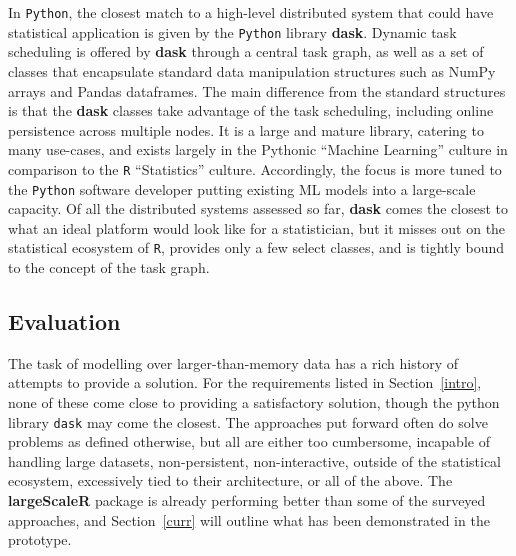 In \texttt{Python}, the closest match to a high-level distributed system that could have statistical application is given by the \texttt{Python} library \textbf{dask}\cite{rocklin2015dask}.
Dynamic task scheduling is offered by \textbf{dask} through a central task graph, as well as a set of classes that encapsulate standard data manipulation structures such as NumPy arrays and Pandas dataframes.
The main difference from the standard structures is that the \textbf{dask} classes take advantage of the task scheduling, including online persistence across multiple nodes.
It is a large and mature library, catering to many use-cases, and exists largely in the Pythonic ``Machine Learning'' culture in comparison to the \texttt{R} ``Statistics'' culture.
Accordingly, the focus is more tuned to the \texttt{Python} software developer putting existing ML models into a large-scale capacity.
Of all the distributed systems assessed so far, \textbf{dask} comes the closest to what an ideal platform would look like for a statistician, but it misses out on the statistical ecosystem of \texttt{R}, provides only a few select classes, and is tightly bound to the concept of the task graph.

\subsection{Evaluation}

The task of modelling over larger-than-memory data has a rich history of attempts to provide a solution.
For the requirements listed in Section~\ref{intro}, none of these come close to providing a satisfactory solution, though the python library \texttt{dask} may come the closest.
The approaches put forward often do solve problems as defined otherwise, but all are either too cumbersome, incapable of handling large datasets, non-persistent, non-interactive, outside of the statistical ecosystem, excessively tied to their architecture, or all of the above.
The \textbf{largeScaleR} package is already performing better than some of the surveyed approaches, and Section~\ref{curr} will outline what has been demonstrated in the prototype.
